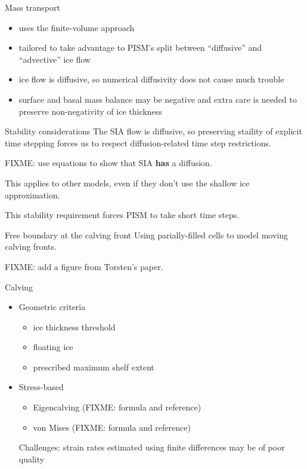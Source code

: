 \documentclass[notes,intlimits]{beamer}
\begin{document}
\begin{frame}{Mass transport}
  \begin{itemize}
  \item uses the finite-volume approach
  \item tailored to take advantage to PISM's split between
    ``diffusive'' and ``advective'' ice flow
  \item ice flow is diffusive, so numerical diffusivity does not cause
    much trouble
  \item surface and basal mass balance may be negative and extra care
    is needed to preserve non-negativity of ice thickness
  \end{itemize}
\end{frame}


\begin{frame}{Stability considerations}
  The SIA flow is diffusive, so preserving staility of explicit time
  stepping forces us to respect diffusion-related time step
  restrictions.

  FIXME: use equations to show that SIA \textbf{has} a diffusion.

  This applies to other models, even if they don't use the shallow ice
  approximation.

  This stability requirement forces PISM to take short time steps.
\end{frame}

\begin{frame}{Free boundary at the calving front}
  Using parially-filled cells to model moving calving fronts.

  FIXME: add a figure from Torsten's paper.
\end{frame}

\begin{frame}{Calving}
  \begin{itemize}
  \item Geometric criteria
    \begin{itemize}
    \item ice thickness threshold
    \item floating ice
    \item prescribed maximum shelf extent
    \end{itemize}
  \item Stress-based
    \begin{itemize}
    \item Eigencalving (FIXME: formula and reference)
    \item von Mises (FIXME: formula and reference)
    \end{itemize}
    Challenges: strain rates estimated using finite differences may be
    of poor quality
  \end{itemize}
\end{frame}
\end{document}
